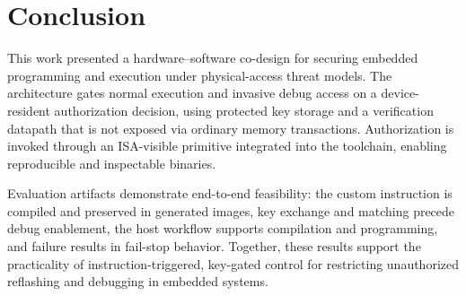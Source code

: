 
\section{Conclusion}
\label{sec:conclusion}

This work presented a hardware--software co-design for securing embedded programming
and execution under physical-access threat models. The architecture gates normal
execution and invasive debug access on a device-resident authorization decision, using
protected key storage and a verification datapath that is not exposed via ordinary
memory transactions. Authorization is invoked through an ISA-visible primitive
integrated into the toolchain, enabling reproducible and inspectable binaries.

Evaluation artifacts demonstrate end-to-end feasibility: the custom instruction is
compiled and preserved in generated images, key exchange and matching precede debug
enablement, the host workflow supports compilation and programming, and failure
results in fail-stop behavior. Together, these results support the practicality of
instruction-triggered, key-gated control for restricting unauthorized reflashing and
debugging in embedded systems.

